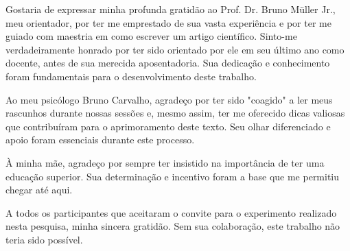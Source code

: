 \begin{agradece}	%

Gostaria de expressar minha profunda gratidão ao Prof. Dr. Bruno Müller Jr., meu
orientador, por ter me emprestado de sua vasta experiência e por ter me guiado
com maestria em como escrever um artigo científico. Sinto-me verdadeiramente
honrado por ter sido orientado por ele em seu último ano como docente, antes de
sua merecida aposentadoria. Sua dedicação e conhecimento foram fundamentais para
o desenvolvimento deste trabalho.

Ao meu psicólogo Bruno Carvalho, agradeço por ter sido "coagido" a ler meus
rascunhos durante nossas sessões e, mesmo assim, ter me oferecido dicas valiosas
que contribuíram para o aprimoramento deste texto. Seu olhar diferenciado e
apoio foram essenciais durante este processo.

À minha mãe, agradeço por sempre ter insistido na importância de ter uma
educação superior. Sua determinação e incentivo foram a base que me permitiu
chegar até aqui.

A todos os participantes que aceitaram o convite para o experimento realizado
nesta pesquisa, minha sincera gratidão. Sem sua colaboração, este trabalho não
teria sido possível.

\end{agradece}

